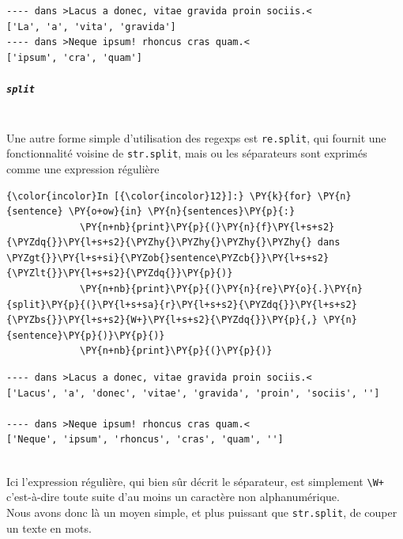     \begin{Verbatim}[commandchars=\\\{\}]
---- dans >Lacus a donec, vitae gravida proin sociis.<
['La', 'a', 'vita', 'gravida']
---- dans >Neque ipsum! rhoncus cras quam.<
['ipsum', 'cra', 'quam']

    \end{Verbatim}

    \hypertarget{split}{%
\subparagraph{\texorpdfstring{\texttt{split}}{split}\\\\}\label{split}}

    Une autre forme simple d'utilisation des regexps est \texttt{re.split},
qui fournit une fonctionnalité voisine de \texttt{str.split}, mais ou
les séparateurs sont exprimés comme une expression régulière

    \begin{Verbatim}[commandchars=\\\{\}]
{\color{incolor}In [{\color{incolor}12}]:} \PY{k}{for} \PY{n}{sentence} \PY{o+ow}{in} \PY{n}{sentences}\PY{p}{:}
             \PY{n+nb}{print}\PY{p}{(}\PY{n}{f}\PY{l+s+s2}{\PYZdq{}}\PY{l+s+s2}{\PYZhy{}\PYZhy{}\PYZhy{}\PYZhy{} dans \PYZgt{}}\PY{l+s+si}{\PYZob{}sentence\PYZcb{}}\PY{l+s+s2}{\PYZlt{}}\PY{l+s+s2}{\PYZdq{}}\PY{p}{)}
             \PY{n+nb}{print}\PY{p}{(}\PY{n}{re}\PY{o}{.}\PY{n}{split}\PY{p}{(}\PY{l+s+sa}{r}\PY{l+s+s2}{\PYZdq{}}\PY{l+s+s2}{\PYZbs{}}\PY{l+s+s2}{W+}\PY{l+s+s2}{\PYZdq{}}\PY{p}{,} \PY{n}{sentence}\PY{p}{)}\PY{p}{)}
             \PY{n+nb}{print}\PY{p}{(}\PY{p}{)}
\end{Verbatim}


    \begin{Verbatim}[commandchars=\\\{\}]
---- dans >Lacus a donec, vitae gravida proin sociis.<
['Lacus', 'a', 'donec', 'vitae', 'gravida', 'proin', 'sociis', '']

---- dans >Neque ipsum! rhoncus cras quam.<
['Neque', 'ipsum', 'rhoncus', 'cras', 'quam', '']


    \end{Verbatim}

    Ici l'expression régulière, qui bien sûr décrit le séparateur, est
simplement \texttt{\textbackslash{}W+} c'est-à-dire toute suite d'au
moins un caractère non alphanumérique.\\

Nous avons donc là un moyen simple, et plus puissant que
\texttt{str.split}, de couper un texte en mots.

